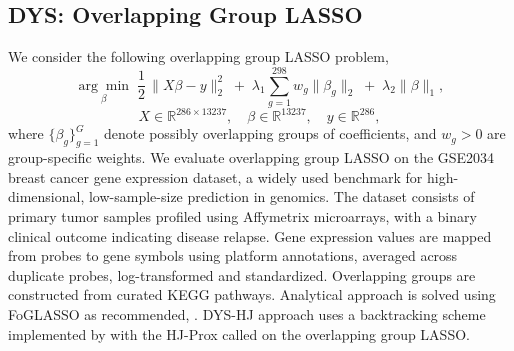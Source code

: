 \documentclass{article}
\theoremstyle{plain}
\theoremstyle{definition}
\theoremstyle{remark}
\begin{document}
\subsection{DYS: Overlapping Group LASSO}
We consider the following overlapping group LASSO problem,
\begin{equation}
\underset{\beta}{\arg\min}\;
\frac{1}{2}\,\| X \beta - y\|_{2}^{2}
\;+\;\lambda_1 \sum_{g=1}^{298} w_g \| \beta_g \|_{2}
\;+\;\lambda_2 \| \beta \|_{1},
\end{equation}
\[
X \in \mathbb{R}^{286 \times 13237},\quad
\beta \in \mathbb{R}^{13237},\quad
y \in \mathbb{R}^{286},
\]
where $\{\beta_g\}_{g=1}^G$ denote possibly overlapping groups of coefficients, and $w_g > 0$ are group-specific weights. We evaluate overlapping group LASSO on the GSE2034 breast cancer gene expression dataset, a widely used benchmark for high-dimensional, low-sample-size prediction in genomics. The dataset consists of primary tumor samples profiled using Affymetrix microarrays, with a binary clinical outcome indicating disease relapse. Gene expression values are mapped from probes to gene symbols using platform annotations, averaged across duplicate probes, log-transformed and standardized. Overlapping groups are constructed from curated KEGG pathways. Analytical approach is solved using FoGLASSO as recommended, \cite{YuanLiuYe2011}. DYS-HJ approach uses a backtracking scheme implemented by \cite{PedregosaGidel2018ICML} with the HJ-Prox called on the overlapping group LASSO.
\end{document}
